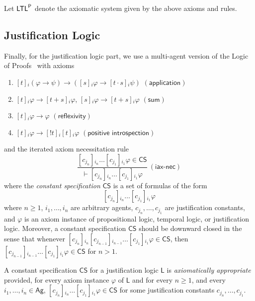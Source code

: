 \documentclass[envcountsect,envcountsame,oribibl,orivec]{llncs}
\newcommand{\lrule}[2]{\displaystyle{\frac{#1}{#2}}}
\newcommand{\limplies}{\rightarrow}
\newcommand{\necrule}{\ensuremath{\textsf{-nec}}}
\newcommand{\LTL}{\textsf{LTL}}
\newcommand{\LTLp}{\LTL^{\sf P}}
\newcommand{\Ag}{\textsf{Ag}}
\newcommand{\jbox}[1]{\left[#1\right]\!}
\newcommand{\tapp}{\cdot}
\newcommand{\tinspect}{!}
\newcommand{\appax}{\ensuremath{(\textsf{application})}}
\newcommand{\sumax}{\ensuremath{(\textsf{sum})}}
\newcommand{\posintax}{\ensuremath{(\textsf{positive introspection})}}
\newcommand{\refax}{\ensuremath{(\textsf{reflexivity})}}
\newcommand{\iteratedconstnecrule}{\ensuremath{(\textsf{iax}\necrule)}}
\newcommand{\CS}{\textsf{CS}}
\newcommand{\agent}{i}
\newcounter{enumsave}
\renewcommand{\phi}{\varphi}
\begin{document}
Let $\LTLp$ denote the axiomatic system given by the above axioms and rules.
 \subsection*{Justification Logic}
 Finally, for the justification logic part, we use a multi-agent version of the Logic of Proofs~\cite{Art01BSL,BucKuzStu11JANCL,Ghari-TCS-2014,TYav08TOCS} with axioms 
 \begin{enumerate}
 	\setcounter{enumi}{\theenumsave}
 	\item $\jbox{t}_\agent (\phi \limplies \psi) \limplies (\jbox{s}_\agent \phi \limplies \jbox{t \tapp s}_\agent \psi)$ \hfill \appax
 	\item $\jbox{t}_\agent \phi \rightarrow \jbox{t + s}_\agent \phi$, $\jbox{s}_\agent \phi \limplies  \jbox{t + s}_\agent \phi$ \hfill \sumax
 	\item $\jbox{t}_\agent \phi \limplies \phi$ \hfill \refax
 	\item $\jbox{t}_\agent \phi \limplies \jbox{\tinspect t}_\agent \jbox{t}_\agent \phi$ \hfill \posintax
 	\setcounter{enumsave}{\theenumi}
 \end{enumerate}


and the iterated axiom necessitation rule
%
\[
\lrule{\jbox{c_{j_n}}_{i_n}\ldots\jbox{c_{j_1}}_{i_1} \phi \in \CS}{\vdash \jbox{c_{j_n}}_{i_n}\ldots\jbox{c_{j_1}}_{i_1} \phi}\ \iteratedconstnecrule
\]
%
where the \textit{constant specification} $\CS$ is a set of formulas of the form
% 
 $$\jbox{c_{j_n}}_{i_n}\ldots\jbox{c_{j_1}}_{i_1} \phi$$ 
% 
 where $n \geq 1$, $i_1,\ldots,i_n$ are arbitrary agents,  $c_{j_n},\ldots,c_{j_1}$ are justification constants, and  $\phi$ is an axiom instance of  propositional logic, temporal logic, or justification logic. Moreover, a constant specification $\CS$ should be downward closed in the sense that whenever $\jbox{c_{j_n}}_{i_n}\jbox{c_{j_{n-1}}}_{i_{n-1}}\ldots\jbox{c_{j_1}}_{i_1} \phi \in \CS$, then $\jbox{c_{j_{n-1}}}_{i_{n-1}}\ldots\jbox{c_{j_1}}_{i_1} \phi \in \CS$ for $n >1$.

\begin{definition}
	A constant specification $\CS$ for a justification logic $\mathsf{L}$ is \textit{axiomatically appropriate} provided, for every axiom instance $\phi$ of $\mathsf{L}$ and for every $n \geq 1$, and every $i_1, \ldots, i_n \in \Ag$,   $\jbox{c_{j_n}}_{i_n}\ldots\jbox{c_{j_1}}_{i_1} \phi \in \CS$ for some justification constants $c_{j_n},\ldots,c_{j_1}$.
\end{definition}
\end{document}
